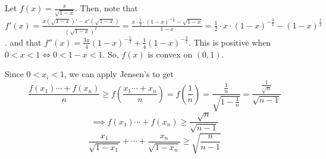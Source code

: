 \documentclass[11pt]{article}
\begin{document}

\begin{sol}
Let $f(x)=\frac{x}{\sqrt{1-x}}$. Then, note that $f'(x)=\frac{x(\sqrt{1-x})' - x'(\sqrt{1-x})}{(\sqrt{1-x})^2} = \frac{x\cdot \frac{1}{2}\cdot (1-x)^{-\frac{1}{2}} - \sqrt{1-x}}{1-x} = \frac{1}{2}\cdot x \cdot (1-x)^{-\frac{3}{2}} - (1-x)^{\frac{1}{2}}$. and that $f''(x) = \frac{3x}{4}(1-x)^{-\frac{5}{2}} + \frac{1}{4}(1-x)^{-\frac{3}{2}}$. This is positive when $0< x< 1\iff 0< 1-x <1$. So, $f(x)$ is convex on $(0,1)$. 

Since $0<x_{i} <1$, we can apply Jensen's to get 
$$\frac{f(x_{1})\cdots + f(x_{n})}{n} \ge f(\frac{x_{1}\cdots + x_{n}}{n}) = f(\frac{1}{n})=\frac{\frac{1}{n}}{\sqrt{1-\frac{1}{n}}}=\frac{\frac{1}{\sqrt{n}}}{\sqrt{n-1}}$$
$$\implies f(x_{1}) \cdots + f(x_{n}) \ge \frac{\sqrt{n}}{\sqrt{n-1}}$$
$$\frac{x_{1}}{\sqrt{1-x_{1}}} + \cdots + \frac{x_{n}}{\sqrt{1-x_{n}}} \ge \sqrt{\frac{n}{n-1}}$$
\end{sol}

\end{document}
